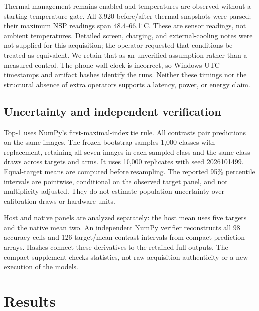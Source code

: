 \documentclass[10pt,twocolumn]{article}
\begin{document}
Thermal management remains enabled and temperatures are observed without a starting-temperature gate. All 3,920 before/after thermal snapshots were parsed; their maximum NSP readings span 48.4--66.1$^\circ$C. These are sensor readings, not ambient temperatures. Detailed screen, charging, and external-cooling notes were not supplied for this acquisition; the operator requested that conditions be treated as equivalent. We retain that as an unverified assumption rather than a measured control. The phone wall clock is incorrect, so Windows UTC timestamps and artifact hashes identify the runs. Neither these timings nor the structural absence of extra operators supports a latency, power, or energy claim.

\subsection{Uncertainty and independent verification}
Top-1 uses NumPy's first-maximal-index tie rule. All contrasts pair predictions on the same images. The frozen bootstrap samples 1,000 classes with replacement, retaining all seven images in each sampled class and the same class draws across targets and arms. It uses 10,000 replicates with seed 2026101499. Equal-target means are computed before resampling. The reported 95\% percentile intervals are pointwise, conditional on the observed target panel, and not multiplicity adjusted. They do not estimate population uncertainty over calibration draws or hardware units.

Host and native panels are analyzed separately: the host mean uses five targets and the native mean two. An independent NumPy verifier reconstructs all 98 accuracy cells and 126 target/mean contrast intervals from compact prediction arrays. Hashes connect these derivatives to the retained full outputs. The compact supplement checks statistics, not raw acquisition authenticity or a new execution of the models.

\section{Results}
\begin{table}[t]
\centering\small

\caption{Complete native final top-1 accuracy (\%) on 7,000 images per artifact. Re-enc. is the no-learning head re-encoding control; Bias is target-aware bias refitting. Values are rounded to two decimals here; exact counts and ties are in the supplement. No arm is omitted or selected after evaluation.}
\label{tab:native}
\end{table}
\end{document}
